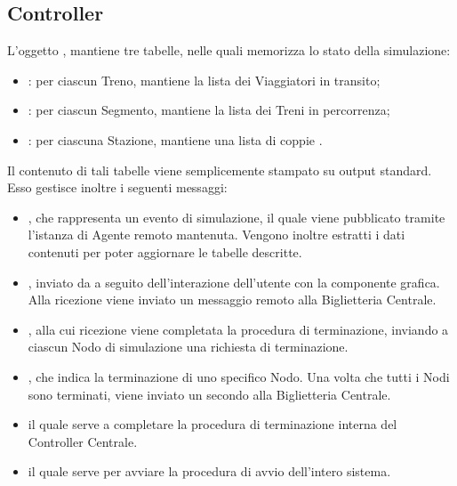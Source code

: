 	\subsection{Controller}
	L'oggetto , mantiene tre tabelle, nelle quali memorizza lo stato della simulazione:
		\begin{itemize}
			\item {}: per ciascun Treno, mantiene la lista dei Viaggiatori in transito;
			\item {}: per ciascun Segmento, mantiene la lista dei Treni in percorrenza;
			\item {}: per ciascuna Stazione, mantiene una lista di coppie .
		\end{itemize}
	Il contenuto di tali tabelle viene semplicemente stampato su output standard.
	Esso gestisce inoltre i seguenti messaggi:
	\begin{itemize}
		\item {}, che rappresenta un evento di simulazione, il quale viene pubblicato tramite l'istanza di Agente remoto mantenuta. Vengono inoltre estratti i dati contenuti per poter aggiornare le tabelle descritte.
		\item {}, inviato da  a seguito dell'interazione dell'utente con la componente grafica. Alla ricezione viene inviato un messaggio remoto  alla Biglietteria Centrale.
		\item {}, alla cui ricezione viene completata la procedura di terminazione, inviando a ciascun Nodo di simulazione una richiesta di terminazione. 
		\item {}, che indica la terminazione di uno specifico Nodo. Una volta che tutti i Nodi sono terminati, viene inviato un secondo  alla Biglietteria Centrale. 
		\item {} il quale serve a completare la procedura di terminazione interna del Controller Centrale.
		\item {} il quale serve per avviare la procedura di avvio dell'intero sistema.
	\end{itemize}
